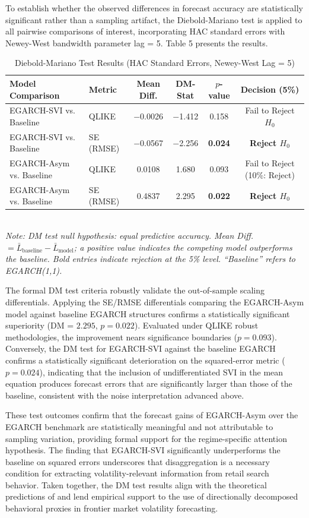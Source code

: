 \documentclass[12pt, a4paper]{article}
\begin{document}
To establish whether the observed differences in forecast accuracy are statistically significant rather than a sampling artifact, the Diebold-Mariano test \citep{diebold1995} is applied to all pairwise comparisons of interest, incorporating HAC standard errors with Newey-West bandwidth parameter lag = 5. Table 5 presents the results.
\begin{table}[H]
\centering
\caption{Diebold-Mariano Test Results (HAC Standard Errors, Newey-West Lag = 5)}
\label{tab:dm}
\small
\begin{tabular}{llcccc}
\toprule
Model Comparison & Metric & Mean Diff. & DM-Stat & $p$-value & Decision (5\%) \\
\midrule
EGARCH-SVI vs. Baseline  & QLIKE     & $-$0.0026 & $-$1.412 & 0.158 & Fail to Reject $H_0$ \\
EGARCH-SVI vs. Baseline  & SE (RMSE) & $-$0.0567 & $-$2.256 & \textbf{0.024} & \textbf{Reject $H_0$} \\
EGARCH-Asym vs. Baseline & QLIKE     & 0.0108  & 1.680  & 0.093 & Fail to Reject (10\%: Reject) \\
EGARCH-Asym vs. Baseline & SE (RMSE) & 0.4837  & 2.295  & \textbf{0.022} & \textbf{Reject $H_0$} \\
\bottomrule
\end{tabular}
\smallskip\\
\footnotesize\textit{Note: DM test null hypothesis: equal predictive accuracy. Mean Diff.\ $= \bar{L}_{\text{baseline}} - \bar{L}_{\text{model}}$; a positive value indicates the competing model outperforms the baseline. Bold entries indicate rejection at the 5\% level. ``Baseline'' refers to EGARCH(1,1).}
\end{table}

The formal DM test criteria robustly validate the out-of-sample scaling differentials. Applying the SE/RMSE differentials comparing the EGARCH-Asym model against baseline EGARCH structures confirms a statistically significant superiority (DM = $2.295$, $p = 0.022$). Evaluated under QLIKE robust methodologies, the improvement nears significance boundaries ($p = 0.093$). Conversely, the DM test for EGARCH-SVI against the baseline EGARCH confirms a statistically significant deterioration on the squared-error metric ($p = 0.024$), indicating that the inclusion of undifferentiated SVI in the mean equation produces forecast errors that are significantly larger than those of the baseline, consistent with the noise interpretation advanced above.

These test outcomes confirm that the forecast gains of EGARCH-Asym over the EGARCH benchmark are statistically meaningful and not attributable to sampling variation, providing formal support for the regime-specific attention hypothesis. The finding that EGARCH-SVI significantly underperforms the baseline on squared errors underscores that disaggregation is a necessary condition for extracting volatility-relevant information from retail search behavior. Taken together, the DM test results align with the theoretical predictions of \citet{fong2002} and lend empirical support to the use of directionally decomposed behavioral proxies in frontier market volatility forecasting.
\end{document}
